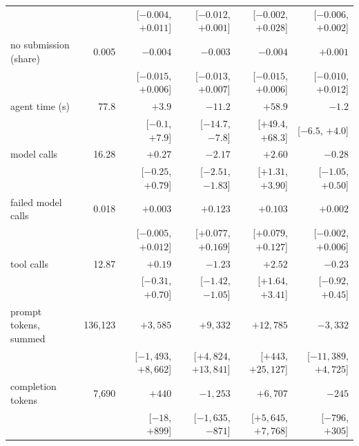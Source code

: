 \begin{table}[!htb]
\begin{tabular}{lrrrrr}
 &  & {\scriptsize [${-}0.004$, ${+}0.011$]} & {\scriptsize [${-}0.012$, ${+}0.001$]} & {\scriptsize [${-}0.002$, ${+}0.028$]} & {\scriptsize [${-}0.006$, ${+}0.002$]} \\[-2pt]
\addlinespace[2pt]%
no submission (share) & 0.005 & ${-}0.004$ & ${-}0.003$ & ${-}0.004$ & ${+}0.001$ \\
 &  & {\scriptsize [${-}0.015$, ${+}0.006$]} & {\scriptsize [${-}0.013$, ${+}0.007$]} & {\scriptsize [${-}0.015$, ${+}0.006$]} & {\scriptsize [${-}0.010$, ${+}0.012$]} \\[-2pt]
\addlinespace[2pt]%
agent time (s) & 77.8 & ${+}3.9$ & ${-}11.2$ & ${+}58.9$ & ${-}1.2$ \\
 &  & {\scriptsize [${-}0.1$, ${+}7.9$]} & {\scriptsize [${-}14.7$, ${-}7.8$]} & {\scriptsize [${+}49.4$, ${+}68.3$]} & {\scriptsize [${-}6.5$, ${+}4.0$]} \\[-2pt]
\addlinespace[2pt]%
model calls & 16.28 & ${+}0.27$ & ${-}2.17$ & ${+}2.60$ & ${-}0.28$ \\
 &  & {\scriptsize [${-}0.25$, ${+}0.79$]} & {\scriptsize [${-}2.51$, ${-}1.83$]} & {\scriptsize [${+}1.31$, ${+}3.90$]} & {\scriptsize [${-}1.05$, ${+}0.50$]} \\[-2pt]
\addlinespace[2pt]%
failed model calls & 0.018 & ${+}0.003$ & ${+}0.123$ & ${+}0.103$ & ${+}0.002$ \\
 &  & {\scriptsize [${-}0.005$, ${+}0.012$]} & {\scriptsize [${+}0.077$, ${+}0.169$]} & {\scriptsize [${+}0.079$, ${+}0.127$]} & {\scriptsize [${-}0.002$, ${+}0.006$]} \\[-2pt]
\addlinespace[2pt]%
tool calls & 12.87 & ${+}0.19$ & ${-}1.23$ & ${+}2.52$ & ${-}0.23$ \\
 &  & {\scriptsize [${-}0.31$, ${+}0.70$]} & {\scriptsize [${-}1.42$, ${-}1.05$]} & {\scriptsize [${+}1.64$, ${+}3.41$]} & {\scriptsize [${-}0.92$, ${+}0.45$]} \\[-2pt]
\addlinespace[2pt]%
prompt tokens, summed & 136{,}123 & ${+}3{,}585$ & ${+}9{,}332$ & ${+}12{,}785$ & ${-}3{,}332$ \\
 &  & {\scriptsize [${-}1{,}493$, ${+}8{,}662$]} & {\scriptsize [${+}4{,}824$, ${+}13{,}841$]} & {\scriptsize [${+}443$, ${+}25{,}127$]} & {\scriptsize [${-}11{,}389$, ${+}4{,}725$]} \\[-2pt]
\addlinespace[2pt]%
completion tokens & 7{,}690 & ${+}440$ & ${-}1{,}253$ & ${+}6{,}707$ & ${-}245$ \\
 &  & {\scriptsize [${-}18$, ${+}899$]} & {\scriptsize [${-}1{,}635$, ${-}871$]} & {\scriptsize [${+}5{,}645$, ${+}7{,}768$]} & {\scriptsize [${-}796$, ${+}305$]} \\
\bottomrule
\end{tabular}
\end{table}
